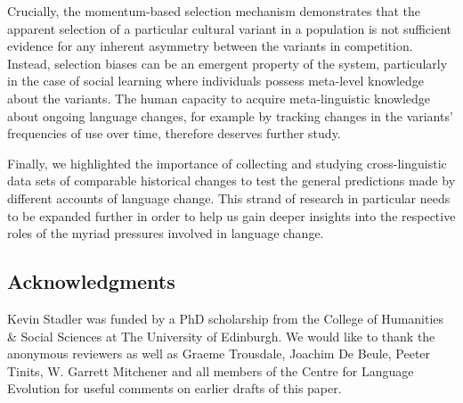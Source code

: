 \documentclass[10pt]{article}
\begin{document}
Crucially, the momentum-based selection mechanism demonstrates that the apparent selection of a particular cultural variant in a population is not sufficient evidence for any inherent asymmetry between the variants in competition. Instead, selection biases can be an emergent property of the system, particularly in the case of social learning where individuals possess meta-level knowledge about the variants. The human capacity to acquire meta-linguistic knowledge about ongoing language changes, for example by tracking changes in the variants' frequencies of use over time, therefore deserves further study.

Finally, we highlighted the importance of collecting and studying cross-linguistic data sets of comparable historical changes to test the general predictions made by different accounts of language change. This strand of research in particular needs to be expanded further in order to help us gain deeper insights into the respective roles of the myriad pressures involved in language change.

\subsection*{Acknowledgments}
Kevin Stadler was funded by a PhD scholarship from the College of Humanities \& Social Sciences at The University of Edinburgh. We would like to thank the anonymous reviewers as well as Graeme Trousdale, Joachim De Beule, Peeter Tinits, W. Garrett Mitchener and all members of the Centre for Language Evolution for useful comments on earlier drafts of this paper.



\end{document}
